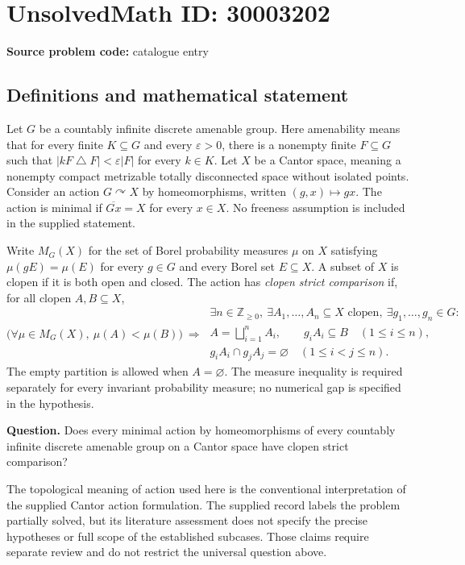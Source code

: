 \documentclass[11pt]{article}
\newcommand{\Z}{\mathbb{Z}}
\begin{document}
\section*{UnsolvedMath ID: 30003202}
\textbf{Source problem code:} catalogue entry
\subsection{Definitions and mathematical statement}
Let \(G\) be a countably infinite discrete amenable group. Here amenability means that for every finite \(K\subseteq G\) and every \(\varepsilon>0\), there is a nonempty finite \(F\subseteq G\) such that \(|kF\mathbin{\triangle}F|<\varepsilon|F|\) for every \(k\in K\). Let \(X\) be a Cantor space, meaning a nonempty compact metrizable totally disconnected space without isolated points. Consider an action \(G\curvearrowright X\) by homeomorphisms, written \((g,x)\mapsto gx\). The action is minimal if \(\overline{Gx}=X\) for every \(x\in X\). No freeness assumption is included in the supplied statement.

Write \(M_G(X)\) for the set of Borel probability measures \(\mu\) on \(X\) satisfying \(\mu(gE)=\mu(E)\) for every \(g\in G\) and every Borel set \(E\subseteq X\). A subset of \(X\) is clopen if it is both open and closed. The action has \emph{clopen strict comparison} if, for all clopen \(A,B\subseteq X\),
\[
\bigl(\forall\mu\in M_G(X),\ \mu(A)<\mu(B)\bigr)
\ \Longrightarrow\
\begin{gathered}
\exists n\in\Z_{\geq 0},\ \exists A_1,\ldots,A_n\subseteq X\text{ clopen},\ \exists g_1,\ldots,g_n\in G:\\
A=\bigsqcup_{i=1}^{n}A_i,\qquad g_iA_i\subseteq B\quad(1\leq i\leq n),\\
g_iA_i\cap g_jA_j=\varnothing\quad(1\leq i<j\leq n).
\end{gathered}
\]
The empty partition is allowed when \(A=\varnothing\). The measure inequality is required separately for every invariant probability measure; no numerical gap is specified in the hypothesis.

\textbf{Question.} Does every minimal action by homeomorphisms of every countably infinite discrete amenable group on a Cantor space have clopen strict comparison?

The topological meaning of action used here is the conventional interpretation of the supplied Cantor action formulation. The supplied record labels the problem partially solved, but its literature assessment does not specify the precise hypotheses or full scope of the established subcases. Those claims require separate review and do not restrict the universal question above.
\end{document}

